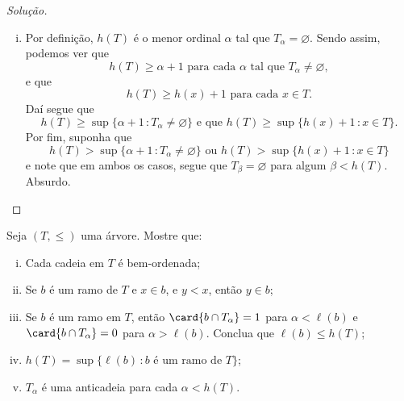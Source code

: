 \documentclass[a4paper]{article}
\theoremstyle{plain}\newtheorem{teo}{Teorema}[section]
\begin{document}
\begin{proof}[Solução]
\begin{enumerate}[(i)]
  \item  Por definição, \(h(T)\) é o menor ordinal
    \(\alpha\) tal que \(T_\alpha=\varnothing\). Sendo assim, podemos ver que
    \[h(T)\geq \alpha +1 \text{ para cada } \alpha \text{ tal que }
      T_\alpha\not=\varnothing,\]
    e que
    \[h(T)\geq h(x)+1\text{ para cada } x\in T.\]
    Daí segue que
    \[h(T)\geq \sup\{\alpha+1\,\colon T_\alpha\not=\varnothing\}\text{ e que }
      h(T)\geq\sup\{h(x)+1\,\colon x\in T\}.\]
    Por fim, suponha que
    \[h(T)> \sup\{\alpha+1\,\colon T_\alpha\not=\varnothing\}\text{ ou } h(T)
      >\sup\{h(x)+1\,\colon x\in T\}\]
    e note que em ambos os casos, segue que \(T_\beta=\varnothing\) para algum \(\beta<
    h(T)\). Absurdo.\qedhere
\end{enumerate}
\end{proof}
\begin{exercicio}
    Seja \((T,\leq)\) uma árvore. Mostre que:
    \begin{enumerate}[(i)]
    \item Cada cadeia em \(T\) é bem-ordenada;
    \item Se \(b\) é um ramo de \(T\) e \(x\in b\), e \(y<x\), então \(y\in b\);
    \item Se \(b\) é um ramo em \(T\), então \(\card{b\cap T_\alpha}=1\) para
      \(\alpha <\ell (b)\) e \(\card{b\cap T_\alpha}=0\) para \(\alpha
      >\ell (b)\). Conclua que \(\ell (b)\leq h(T)\);
    \item \(h(T)=\sup\{\ell (b)\,\colon b \text{ é um ramo de } T\}\);
    \item \(T_\alpha\) é uma anticadeia para cada \(\alpha < h(T)\).
     \end{enumerate}
  \end{exercicio}
\end{document}
